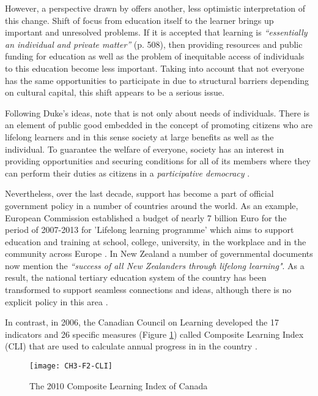 However, a perspective drawn by \citet{Duke2001} offers another, less optimistic
interpretation of this change. Shift of focus from education itself to the
learner brings up important and unresolved problems. If it is accepted that
learning is \textit{``essentially an individual and private matter''} (p. 508),
then providing resources and public funding for education as well as the problem
of inequitable access of individuals to this education become less important.
Taking into account that not everyone has the same opportunities to participate
in \LLLs due to structural barriers depending on cultural capital, this shift
appears to be a serious issue.

Following Duke's ideas, \citet{Aspin2001} note that \LLLs is not only about
needs of individuals. There is an element of public good embedded in the concept
of promoting citizens who are lifelong learners and in this sense society at
large benefits as well as the individual. To guarantee the welfare of everyone,
society has an interest in providing opportunities and securing conditions for
all of its members where they can perform their duties as citizens in a
\textit{participative democracy} \citep{Aspin2001}.

Nevertheless, over the last decade, \LLLs support has become a part of official
government policy in a number of countries around the world. As an example,
European Commission established a budget of nearly 7 billion Euro for the period
of 2007-2013 for 'Lifelong learning programme' which aims to support education
and training at school, college, university, in the workplace and in the
community across Europe \citep{TheEducation2009}. In New Zealand a number of
governmental documents \citep{NewZealandMinistryofEducation2008} now mention the
\textit{``success of all New Zealanders through lifelong learning"}. As a
result, the national tertiary education system of the country has been
transformed to support seamless connections and \LLLs ideas, although there is
no explicit policy in this area \citep{Benseman2006}.

In contrast, in 2006, the Canadian Council on Learning developed the 17
indicators and 26 specific measures (Figure \ref{fig:cli2010}) called Composite
Learning Index (CLI) that are used to calculate annual progress in \LLLs in the
country \citep{CanadianCouncilonLearning2011}. 

\begin{figure}[htb]
\centering 
\texttt{[image: CH3-F2-CLI]}
\caption[The 2010 Composite Learning Index of Canada]{The 2010 Composite
Learning Index of Canada \citep{CanadianCouncilonLearning2011}}
\label{fig:cli2010}
\end{figure}

